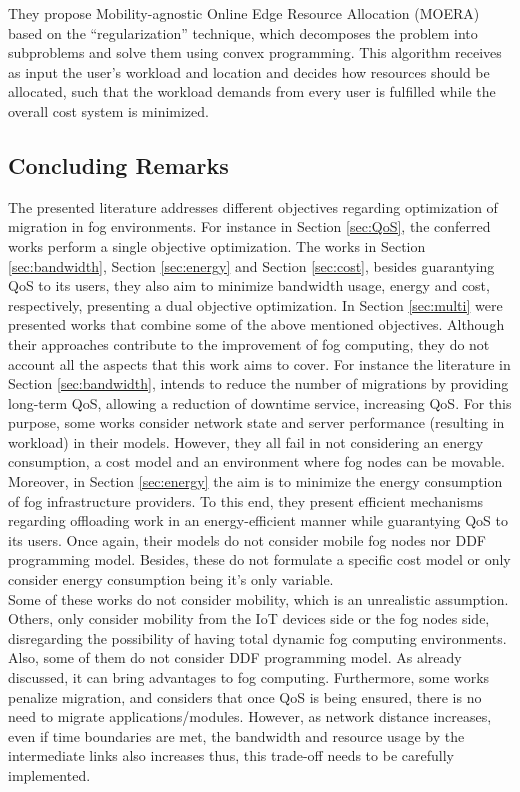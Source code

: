 They propose Mobility-agnostic Online Edge Resource Allocation (MOERA) based on the ``regularization'' technique, which decomposes the problem into subproblems and solve them using convex programming. This algorithm receives as input the user’s workload and location and decides how resources should be allocated, such that the workload demands from every user is fulfilled while the overall cost system is minimized.

\subsection{Concluding Remarks}
The presented literature addresses different objectives regarding optimization of migration in fog environments. For instance in Section \ref{sec:QoS}, the conferred works perform a single objective optimization. The works in Section \ref{sec:bandwidth}, Section \ref{sec:energy} and Section \ref{sec:cost}, besides guarantying QoS to its users, they also aim to minimize bandwidth usage, energy and cost, respectively, presenting a dual objective optimization. In Section \ref{sec:multi} were presented works that combine some of the above mentioned objectives.  Although their approaches contribute to the improvement of fog computing, they do not account all the aspects that this work aims to cover. For instance the literature in Section \ref{sec:bandwidth}, intends to reduce the number of migrations by providing long-term QoS, allowing a reduction of downtime service, increasing QoS. For this purpose, some works consider network state and server performance (resulting in workload) in their models. However, they all fail in not considering an energy consumption, a cost model and an environment where fog nodes can be movable. Moreover, in Section \ref{sec:energy} the aim is to minimize the energy consumption of fog infrastructure providers. To this end, they present efficient mechanisms regarding offloading work in an energy-efficient manner while guarantying QoS to its users. Once again, their models do not consider mobile fog nodes nor DDF programming model. Besides, these do not formulate a specific cost model or only consider energy consumption being it's only variable.\\
\noindent\tab Some of these works do not consider mobility, which is an unrealistic assumption. Others, only consider mobility from the IoT devices side or the fog nodes side, disregarding the possibility of having total dynamic fog computing environments. Also, some of them do not consider DDF programming model. As already discussed, it can bring advantages to fog computing. Furthermore, some works penalize migration, and considers that once QoS is being ensured, there is no need to migrate applications/modules. However, as network distance increases, even if time boundaries are met, the bandwidth and resource usage by the intermediate links also increases thus, this trade-off needs to be carefully implemented.